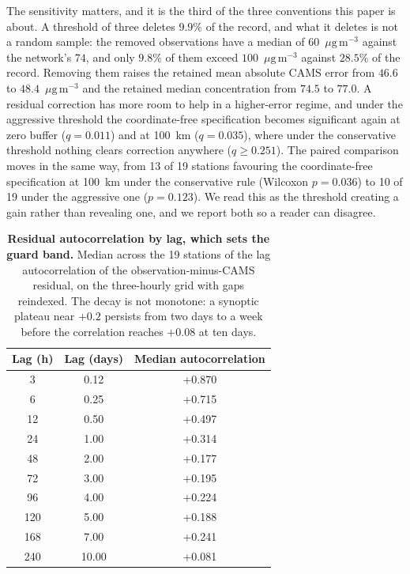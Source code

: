 \documentclass[11pt]{article}
\newcommand*{\ugm}{\ensuremath{\mu\mathrm{g\,m^{-3}}}}
\begin{document}
The sensitivity matters, and it is the third of the three conventions this paper is about.
A threshold of three deletes $9.9\%$ of the record, and what it deletes is not a random
sample: the removed observations have a median of $60$~\ugm{} against the network's $74$,
and only $9.8\%$ of them exceed $100$~\ugm{} against $28.5\%$ of the record. Removing them
raises the retained mean absolute CAMS error from $46.6$ to $48.4$~\ugm{} and the retained
median concentration from $74.5$ to $77.0$. A residual correction has more room to help in
a higher-error regime, and under the aggressive threshold the coordinate-free specification
becomes significant again at zero buffer ($q=0.011$) and at 100~km ($q=0.035$), where under
the conservative threshold nothing clears correction anywhere ($q\geq0.251$). The paired
comparison moves in the same way, from 13 of 19 stations favouring the coordinate-free
specification at 100~km under the conservative rule (Wilcoxon $p=0.036$) to 10 of 19 under
the aggressive one ($p=0.123$). We read this as the threshold creating a gain rather
than revealing one, and we report both so a reader can disagree.

\begin{table}[htbp]\centering\footnotesize
\caption{\textbf{Residual autocorrelation by lag, which sets the guard band.} Median across the 19 stations of the lag autocorrelation of the observation-minus-CAMS residual, on the three-hourly grid with gaps reindexed. The decay is not monotone: a synoptic plateau near $+0.2$ persists from two days to a week before the correlation reaches $+0.08$ at ten days.}
\begin{tabular}{ccc}\toprule
Lag (h) & Lag (days) & Median autocorrelation \\ \midrule
3 & 0.12 & +0.870 \\
6 & 0.25 & +0.715 \\
12 & 0.50 & +0.497 \\
24 & 1.00 & +0.314 \\
48 & 2.00 & +0.177 \\
72 & 3.00 & +0.195 \\
96 & 4.00 & +0.224 \\
120 & 5.00 & +0.188 \\
168 & 7.00 & +0.241 \\
240 & 10.00 & +0.081 \\
\bottomrule\end{tabular}\end{table}
\end{document}
